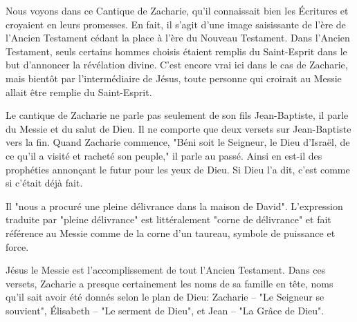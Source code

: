 

Nous voyons dans ce Cantique de Zacharie, qu'il connaissait bien les Écritures et croyaient en leurs promesses. En fait, il s'agit d'une image saisissante de l'ère de l'Ancien Testament cédant la place à l'ère du Nouveau Testament. Dans l'Ancien Testament, seuls certains hommes choisis étaient remplis du Saint-Esprit dans le but d'annoncer la révélation divine. C'est encore vrai ici dans le cas de Zacharie, mais bientôt par l'intermédiaire de Jésus, toute personne qui croirait au Messie allait être remplie du Saint-Esprit.

Le cantique de Zacharie ne parle pas seulement de son fils Jean-Baptiste, il parle du Messie et du salut de Dieu. Il ne comporte que deux versets sur Jean-Baptiste vers la fin. Quand Zacharie commence, "Béni soit le Seigneur, le Dieu d’Israël, de ce qu’il a visité et racheté son peuple," il parle au passé. Ainsi en est-il des prophéties annonçant le futur pour les yeux de Dieu. Si Dieu l'a dit, c'est comme si c'était déjà fait.

Il "nous a procuré une pleine délivrance dans la maison de David". L'expression traduite par "pleine délivrance" est littéralement "corne de délivrance" et fait référence au Messie comme de la corne d'un taureau, symbole de puissance et force.

Jésus le Messie est l'accomplissement de tout l'Ancien Testament. Dans ces versets, Zacharie a presque certainement les noms de sa famille en tête, noms qu'il sait avoir été donnés selon le plan de Dieu: Zacharie – "Le Seigneur se souvient", Élisabeth – "Le serment de Dieu", et Jean – "La Grâce de Dieu".

